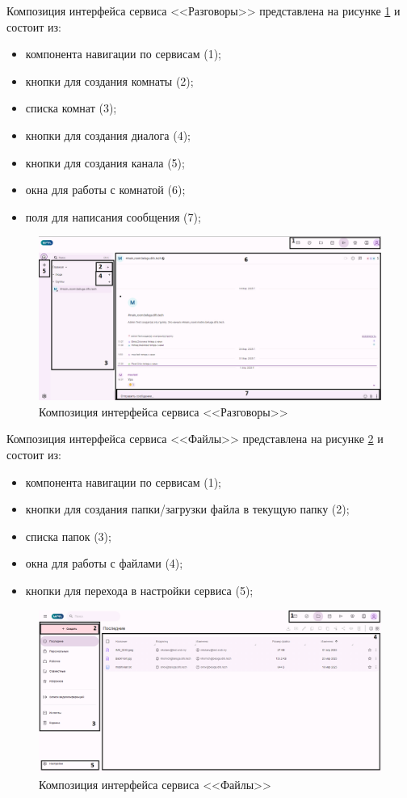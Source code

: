 Композиция интерфейса сервиса <<Разговоры>> представлена на рисунке \ref{templ:image8} и состоит из:
\begin{itemize}
  \item компонента навигации по сервисам (1);
  \item кнопки для создания комнаты (2);
  \item списка комнат (3);
  \item кнопки для создания диалога (4);
  \item кнопки для создания канала (5);
  \item окна для работы с комнатой (6);
  \item поля для написания сообщения (7);
\end{itemize}
\begin{figure}[H]
	\centering
	\includegraphics[width=1\linewidth]{images/разговоры}
	\caption{Композиция интерфейса сервиса <<Разговоры>>}
	\label{templ:image8}
\end{figure}

Композиция интерфейса сервиса <<Файлы>> представлена на рисунке \ref{templ:image9} и состоит из:
\begin{itemize}
  \item компонента навигации по сервисам (1);
  \item кнопки для создания папки/загрузки файла в текущую папку (2);
  \item списка папок (3);
  \item окна для работы с файлами (4);
  \item кнопки для перехода в настройки сервиса (5);
\end{itemize}
\begin{figure}[H]
	\centering
	\includegraphics[width=1\linewidth]{images/файлы}
	\caption{Композиция интерфейса сервиса <<Файлы>>}
	\label{templ:image9}
\end{figure}

